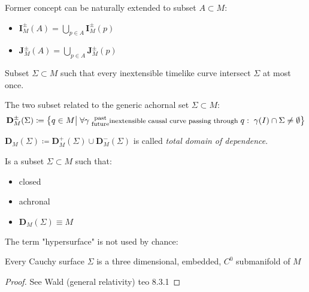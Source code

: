 \documentclass[a4paper,12pt]{scrartcl}    %
\begin{document}
	\begin{notationfix}
		Former concept can be naturally extended to subset $A \subset M$:
			\begin{itemize}
				\item $\mathbf{I}_M^\pm(A) = \bigcup_{p\in A} \mathbf{I}_M^\pm(p) $
				\item $\mathbf{J}_M^\pm(A) = \bigcup_{p\in A} \mathbf{J}_M^\pm(p) $
			\end{itemize}
	\end{notationfix}

	\begin{definition}
		Subset $\Sigma \subset M$ such that every inextensible timelike curve intersect $\Sigma$ at most once.
	\end{definition}

	\begin{definition}
		The two subset related to the generic achornal set $\Sigma \subset M$:
		\begin{displaymath}		
			\mathbf{D}_M^\pm(\Sigma) \coloneqq \big\{ q \in M \big\vert \; \forall \gamma \substack{\textrm{ past}\\ \textrm{ future} }\textrm{\footnotesize inextensible causal curve passing through }q : \; \gamma(I) \cap \Sigma \neq \emptyset  \big\}
		\end{displaymath}		
	\end{definition}

	\begin{notationfix}
		$\mathbf{D}_M(\Sigma)  \coloneq \mathbf{D}_M^+(\Sigma) \cup \mathbf{D}_M^-(\Sigma)$ is called \emph{total domain of dependence}.
	\end{notationfix}

	\begin{definition}
		Is a subset $\Sigma \subset M$ such that:
		\begin{itemize}
			\item closed
			\item achronal
			\item $\mathbf{D}_M(\Sigma) \equiv M$
		\end{itemize}
	\end{definition}

	The term "hypersurface" is not used by chance:	
	\begin{proposition}
		Every Cauchy surface $\Sigma$ is a three dimensional, embedded, $C^0$ submanifold of $M$
	\end{proposition}
	\begin{proof}
		See Wald (general relativity) teo 8.3.1
	\end{proof}
	
\end{document}
